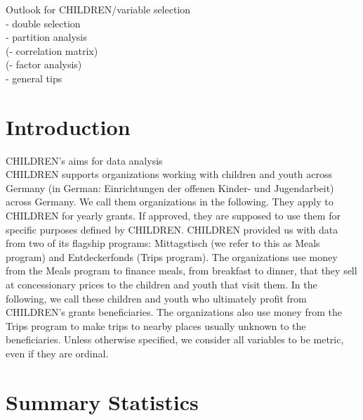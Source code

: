 \documentclass[12pt, a4paper]{article}\usepackage[]{graphicx}\usepackage[]{color}
\begin{document}
Outlook for CHILDREN/variable selection\\
- double selection \\
- partition analysis\\
(- correlation matrix)\\
(- factor analysis)\\
- general tips\\

\section{Introduction}

CHILDREN's aims for data analysis\\ 
CHILDREN supports organizations working with children and youth across Germany (in German: Einrichtungen der offenen Kinder- und Jugendarbeit) across Germany. We call them organizations in the following. They apply to CHILDREN for yearly grants. If approved, they are supposed to use them for specific purposes defined by CHILDREN. CHILDREN provided us with data from two of its flagship programs: Mittagstisch (we refer to this as Meals program) and Entdeckerfonds (Trips program). The organizations use money from the Meals program to finance meals, from breakfast to dinner, that they sell at concessionary prices to the children and youth that visit them. In the following, we call these children and youth who ultimately profit from CHILDREN's grants beneficiaries. The organizations also use money from the Trips program to make trips to nearby places usually unknown to the beneficiaries.  
Unless otherwise specified, we consider all variables to be metric, even if they are ordinal. 

\section{Summary Statistics}

\end{document}
